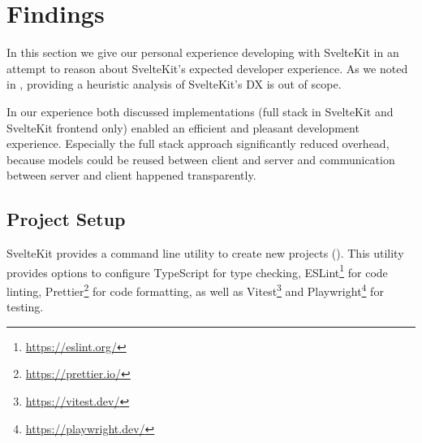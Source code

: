 \section{Findings}
In this section we give our personal experience developing with SvelteKit in an attempt to reason about SvelteKit's expected developer experience. As we noted in , providing a heuristic analysis of SvelteKit's DX is out of scope.

In our experience both discussed implementations (full stack in SvelteKit and SvelteKit frontend only) enabled an efficient and pleasant development experience. Especially the full stack approach significantly reduced overhead, because models could be reused between client and server and communication between server and client happened transparently.


\subsection{Project Setup}
SvelteKit provides a command line utility to create new projects (). This utility provides options to configure TypeScript for type checking, ESLint\footnote{\url{https://eslint.org/}} for code linting, Prettier\footnote{\url{https://prettier.io/}} for code formatting, as well as Vitest\footnote{\url{https://vitest.dev/}} and Playwright\footnote{\url{https://playwright.dev/}} for testing. 


